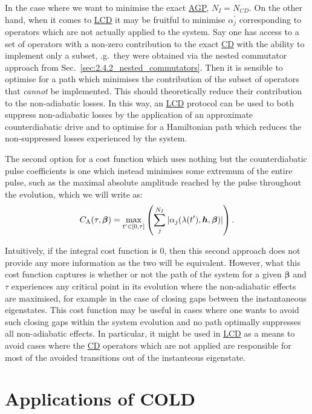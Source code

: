 \documentclass[a4paper,oneside,11pt]{book}
\newcommand{\betabb}{\boldsymbol{\beta}}
\newcommand{\hbb}{\boldsymbol{h}}
\newcommand{\acrref}[1]{\hyperref[acr:#1]{#1}}
\begin{document}
In the case where we want to minimise the exact \acrref{AGP}, $N_I = N_{CD}$. On the other hand, when it comes to \acrref{LCD} it may be fruitful to minimise $\alpha_j^{\prime}$ corresponding to operators which are not actually applied to the system. Say one has access to a set of operators with a non-zero contribution to the exact \acrref{CD} with the ability to implement only a subset, \@e.g.~they were obtained via the nested commutator approach from Sec.~\ref{sec:2.4.2_nested_commutators}. Then it is sensible to optimise for a path which minimises the contribution of the subset of operators that \emph{cannot} be implemented. This should theoretically reduce their contribution to the non-adiabatic losses. In this way, an \acrref{LCD} protocol can be used to both suppress non-adiabatic losses by the application of an approximate counterdiabatic drive and to optimise for a Hamiltonian path which reduces the non-suppressed losses experienced by the system.

The second option for a cost function which uses nothing but the counterdiabatic pulse coefficients is one which instead minimises some extremum of the entire pulse, such as the maximal absolute amplitude reached by the pulse throughout the evolution, which we will write as:
\begin{equation}\label{eq:COLD_costfunc_maximum}
    C_{\rm A}(\tau, \betabb) = \max_{t^{\prime} \in [0,\tau]} \left( \sum_j^{N_I} | \alpha_j(\lambda(t^{\prime}), \hbb, \betabb)|\right).
\end{equation}

Intuitively, if the integral cost function is $0$, then this second approach does not provide any more information as the two will be equivalent. However, what this cost function captures is whether or not the path of the system for a given $\betabb$ and $\tau$ experiences any critical point in its evolution where the non-adiabatic effects are maximised, for example in the case of closing gaps between the instantaneous eigenstates. This cost function may be useful in cases where one wants to avoid such closing gaps within the system evolution and no path optimally suppresses all non-adiabatic effects. In particular, it might be used in \acrref{LCD} as a means to avoid cases where the \acrref{CD} operators which are not applied are responsible for most of the avoided transitions out of the instanteous eigenstate.
\part{Applications of COLD}\label{part:applications}
\end{document}

